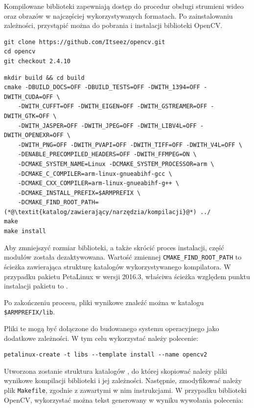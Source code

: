 Kompilowane biblioteki zapewniają dostęp do procedur obsługi strumieni wideo oraz obrazów w najczęściej wykorzystywanych formatach.
Po zainstalowaniu zależności, przystąpić można do pobrania i instalacji biblioteki OpenCV.

\begin{lstlisting}[breaklines=true, caption=Pobieranie biblioteki OpenCV w wersji 2.4.10.]
git clone https://github.com/Itseez/opencv.git
cd opencv
git checkout 2.4.10
\end{lstlisting}

\begin{lstlisting}[breaklines=true, caption=Kompilacja biblioteki \textit{OpenCV}.]
mkdir build && cd build
cmake -DBUILD_DOCS=OFF -DBUILD_TESTS=OFF -DWITH_1394=OFF -DWITH_CUDA=OFF \
	-DWITH_CUFFT=OFF -DWITH_EIGEN=OFF -DWITH_GSTREAMER=OFF -DWITH_GTK=OFF \
	-DWITH_JASPER=OFF -DWITH_JPEG=OFF -DWITH_LIBV4L=OFF -DWITH_OPENEXR=OFF \
	-DWITH_PNG=OFF -DWITH_PVAPI=OFF -DWITH_TIFF=OFF -DWITH_V4L=OFF \
	-DENABLE_PRECOMPILED_HEADERS=OFF -DWITH_FFMPEG=ON \
	-DCMAKE_SYSTEM_NAME=Linux -DCMAKE_SYSTEM_PROCESSOR=arm \
	-DCMAKE_C_COMPILER=arm-linux-gnueabihf-gcc \
	-DCMAKE_CXX_COMPILER=arm-linux-gnueabihf-g++ \
	-DCMAKE_INSTALL_PREFIX=$ARMPREFIX \
	-DCMAKE_FIND_ROOT_PATH=(*@\textit{katalog/zawierający/narzędzia/kompilacji}@*) ../
make
make install
\end{lstlisting}

Aby zmniejszyć rozmiar biblioteki, a także skrócić proces instalacji, część modułów została dezaktywowana. 
Wartość zmiennej \texttt{CMAKE\_FIND\_ROOT\_PATH} to ścieżka zawierająca strukturę katalogów wykorzystywanego kompilatora. 
W przypadku pakietu PetaLinux w wersji 2016.3, właściwa ścieżka względem punktu instalacji pakietu to .

Po zakończeniu procesu, pliki wynikowe znaleźć można w katalogu \texttt{\$ARMPREFIX/lib}.

Pliki te mogą być dołączone do budowanego systemu operacyjnego jako dodatkowe zależności. %
W tym celu wykorzystać należy polecenie:

\begin{lstlisting}[breaklines=true]
petalinux-create -t libs --template install --name opencv2
\end{lstlisting}

Utworzona zostanie struktura katalogów , do której skopiować należy pliki wynikowe kompilacji biblioteki i jej zależności. 
Następnie, zmodyfikować należy plik \texttt{Makefile}, zgodnie z zawartymi w nim instrukcjami. 
W przypadku biblioteki OpenCV, wykorzystać można tekst generowany w wyniku wywołania polecenia:

